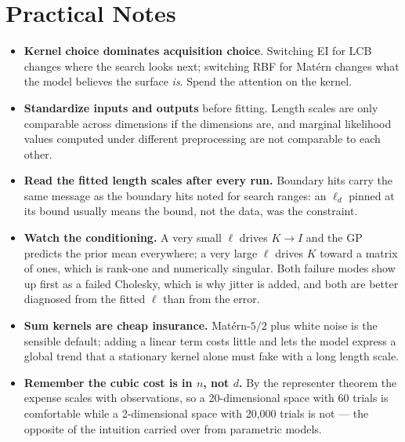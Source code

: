 \documentclass[conference]{IEEEtran}
\begin{document}
\section*{Practical Notes}
\begin{itemize}
    \item \textbf{Kernel choice dominates acquisition choice}. Switching EI for LCB changes where the search looks next; switching RBF for Mat\'ern changes what the model believes the surface \textit{is}. Spend the attention on the kernel.
    \item \textbf{Standardize inputs and outputs} before fitting. Length scales are only comparable across dimensions if the dimensions are, and marginal likelihood values computed under different preprocessing are not comparable to each other.
    \item \textbf{Read the fitted length scales after every run.} Boundary hits carry the same message as the boundary hits noted for search ranges: an $\ell_d$ pinned at its bound usually means the bound, not the data, was the constraint.
    \item \textbf{Watch the conditioning.} A very small $\ell$ drives $K \to I$ and the GP predicts the prior mean everywhere; a very large $\ell$ drives $K$ toward a matrix of ones, which is rank-one and numerically singular. Both failure modes show up first as a failed Cholesky, which is why jitter is added, and both are better diagnosed from the fitted $\ell$ than from the error.
    \item \textbf{Sum kernels are cheap insurance.} Mat\'ern-$5/2$ plus white noise is the sensible default; adding a linear term costs little and lets the model express a global trend that a stationary kernel alone must fake with a long length scale.
    \item \textbf{Remember the cubic cost is in $n$, not $d$.} By the representer theorem the expense scales with observations, so a 20-dimensional space with 60 trials is comfortable while a 2-dimensional space with 20{,}000 trials is not --- the opposite of the intuition carried over from parametric models.
\end{itemize}
\end{document}

